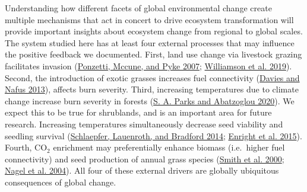 \documentclass[
  12pt,
]{article}
\begin{document}
Understanding how different facets of global environmental change create
multiple mechanisms that act in concert to drive ecosystem
transformation will provide important insights about ecosystem change
from regional to global scales. The system studied here has at least
four external processes that may influence the positive feedback we
documented. First, land use change via livestock grazing facilitates
invasion (\protect\hyperlink{ref-Ponzetti2007}{Ponzetti, Mccune, and
Pyke 2007}; \protect\hyperlink{ref-Williamson2019}{Williamson et al.
2019}). Second, the introduction of exotic grasses increases fuel
connectivity (\protect\hyperlink{ref-Davies2013}{Davies and Nafus
2013}), affects burn severity. Third, increasing temperatures due to
climate change increase burn severity in forests
(\protect\hyperlink{ref-Parks2020}{S. A. Parks and Abatzoglou 2020}). We
expect this to be true for shrublands, and is an important area for
future research. Increasing temperatures simultaneously decrease seed
viability and seedling survival
(\protect\hyperlink{ref-Schlaepfer2014}{Schlaepfer, Lauenroth, and
Bradford 2014}; \protect\hyperlink{ref-Enright2015}{Enright et al.
2015}). Fourth, CO\(_2\) enrichment may preferentially enhance biomass
(i.e.~higher fuel connectivity) and seed production of annual grass
species (\protect\hyperlink{ref-Smith2000}{Smith et al. 2000};
\protect\hyperlink{ref-Nagel2004}{Nagel et al. 2004}). All four of these
external drivers are globally ubiquitous consequences of global change.
\end{document}
